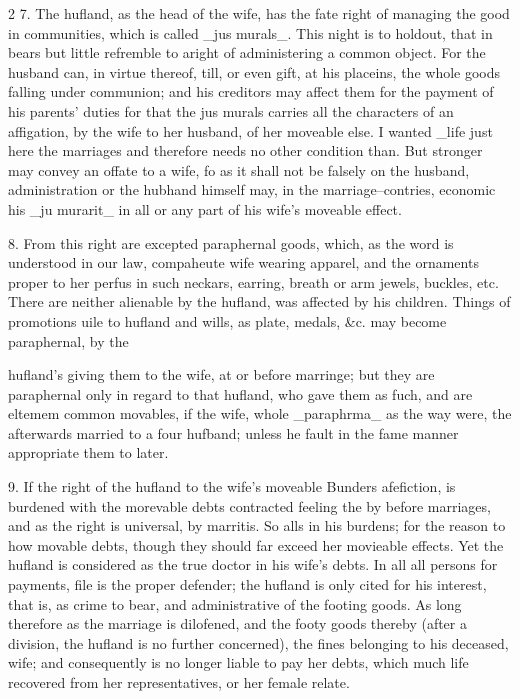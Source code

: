 \documentclass[10pt]{article}
\begin{document}
\begin{multicols}{2}
7. The hufland, as the head of the wife, has the fate right of managing the good in communities, which is called \_jus murals\_. This night is to holdout, that in bears but little refremble to aright of administering a common object. For the husband can, in virtue thereof, till, or even gift, at his placeins, the whole goods falling under communion; and his creditors may affect them for the payment of his parents’ duties for that the jus murals carries all the characters of an affigation, by the wife to her husband, of her moveable else. I wanted \_life just here the marriages and therefore needs no other condition than. But stronger may convey an offate to a wife, fo as it shall not be falsely on the husband, administration or the hubhand himself may, in the marriage–contries, economic his \_ju murarit\_ in all or any part of his wife’s moveable effect.

8. From this right are excepted paraphernal goods, which, as the word is understood in our law, compaheute wife wearing apparel, and the ornaments proper to her perfus in such neckars, earring, breath or arm jewels, buckles, etc. There are neither alienable by the hufland, was affected by his children. Things of promotions uile to hufland and wills, as plate, medals, \&c. may become paraphernal, by the

hufland's giving them to the wife, at or before marringe; but they are paraphernal only in regard to that hufland, who gave them as fuch, and are eltemem common movables, if the wife, whole \_paraphrma\_ as the way were, the afterwards married to a four hufband; unless he fault in the fame manner appropriate them to later.

9. If the right of the hufland to the wife’s moveable Bunders afefiction, is burdened with the morevable debts contracted feeling the by before marriages, and as the right is universal, by marritis. So alls in his burdens; for the reason to how movable debts, though they should far exceed her movieable effects. Yet the hufland is considered as the true doctor in his wife’s debts. In all all persons for payments, file is the proper defender; the hufland is only cited for his interest, that is, as crime to bear, and administrative of the footing goods. As long therefore as the marriage is dilofened, and the footy goods thereby (after a division, the hufland is no further concerned), the fines belonging to his deceased, wife; and consequently is no longer liable to pay her debts, which much life recovered from her representatives, or her female relate.


\end{multicols}
\end{document}
